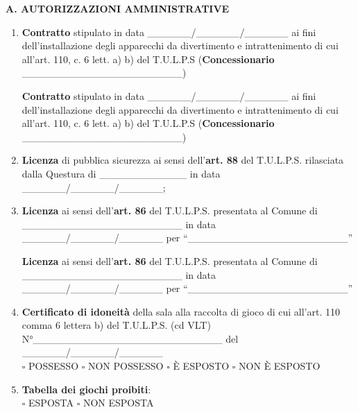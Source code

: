\documentclass[12pt]{article}
\begin{document}
\begin{center}
    \textbf{A.	AUTORIZZAZIONI AMMINISTRATIVE}
\end{center}
\begin{enumerate}
    \item \textbf{Contratto} stipulato in data \_\_\_\_\_\_/\_\_\_\_\_\_/\_\_\_\_\_\_ ai fini dell’installazione degli apparecchi da divertimento e intrattenimento di cui all’art. 110, c. 6 lett. a) b) del T.U.L.P.S
    (\textbf{Concessionario} \_\_\_\_\_\_\_\_\_\_\_\_\_\_\_\_\_\_\_\_\_\_)

    \textbf{Contratto} stipulato in data \_\_\_\_\_\_/\_\_\_\_\_\_/\_\_\_\_\_\_ ai fini dell’installazione degli apparecchi da divertimento e intrattenimento di cui all’art. 110, c. 6 lett. a) b) del T.U.L.P.S
    (\textbf{Concessionario} \_\_\_\_\_\_\_\_\_\_\_\_\_\_\_\_\_\_\_\_\_\_)
    \item \textbf{Licenza} di pubblica sicurezza ai sensi dell’\textbf{art. 88} del T.U.L.P.S. rilasciata dalla Questura di \_\_\_\_\_\_\_\_\_\_\_\_ in data \_\_\_\_\_\_/\_\_\_\_\_\_/\_\_\_\_\_\_;
    \item \textbf{Licenza} ai sensi dell’\textbf{art. 86} del T.U.L.P.S. presentata al Comune di \_\_\_\_\_\_\_\_\_\_\_\_\_\_\_\_\_\_\_\_\_\_ in data \_\_\_\_\_\_/\_\_\_\_\_\_/\_\_\_\_\_\_  per “\_\_\_\_\_\_\_\_\_\_\_\_\_\_\_\_\_\_\_\_\_\_”

    \textbf{Licenza} ai sensi dell’\textbf{art. 86} del T.U.L.P.S. presentata al Comune di \_\_\_\_\_\_\_\_\_\_\_\_\_\_\_\_\_\_\_\_\_\_  in data \_\_\_\_\_\_/\_\_\_\_\_\_/\_\_\_\_\_\_  per “\_\_\_\_\_\_\_\_\_\_\_\_\_\_\_\_\_\_\_\_\_\_”

    \item \textbf{Certificato di idoneità} della sala alla raccolta di gioco di cui all'art. 110 comma 6 lettera b) del T.U.L.P.S. (cd VLT) N°\_\_\_\_\_\_\_\_\_\_\_\_\_\_\_\_\_\_\_\_\_\_\_\_\_\_ del \_\_\_\_\_\_/\_\_\_\_\_\_/\_\_\_\_\_\_ \\
    \begin{math}\square\end{math} POSSESSO \begin{math}\square\end{math} NON POSSESSO
    \begin{math}\square\end{math} È ESPOSTO \begin{math}\square\end{math} NON È ESPOSTO

    \item \textbf{Tabella dei giochi proibiti}: \\
    \begin{math}\square\end{math} ESPOSTA \begin{math}\square\end{math} NON ESPOSTA


\end{enumerate}
\end{document}
